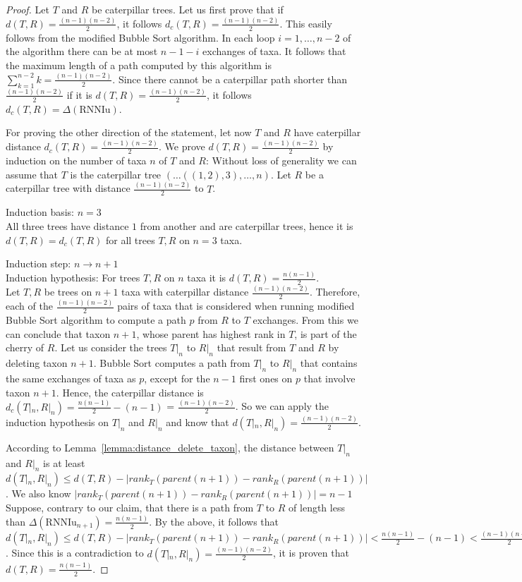 \documentclass{amsart}
\newcommand{\rnniu}{\mathrm{RNNIu}}
\begin{document}
\begin{proof}
    Let $T$ and $R$ be caterpillar trees.
    Let us first prove that if $d(T,R) = \frac{(n-1)(n-2)}{2}$, it follows $d_c(T,R) = \frac{(n-1)(n-2)}{2}$.
    This easily follows from the modified Bubble Sort algorithm. 
    In each loop $i=1, \ldots, n-2$ of the algorithm there can be at most $n-1-i$ exchanges of taxa.
    It follows that the maximum length of a path computed by this algorithm is $\sum\limits_{k=1}^{n-2} k = \frac{(n-1)(n-2)}{2}$.
    Since there cannot be a caterpillar path shorter than $\frac{(n-1)(n-2)}{2}$ if it is $d(T,R) = \frac{(n-1)(n-2)}{2}$, it follows $d_c(T,R) = \Delta(\rnniu)$.

    For proving the other direction of the statement, let now $T$ and $R$ have caterpillar distance $d_c(T,R) =  \frac{(n-1)(n-2)}{2}$.
    We prove $d(T,R) = \frac{(n-1)(n-2)}{2}$ by induction on the number of taxa $n$ of $T$ and $R$:
    Without loss of generality we can assume that $T$ is the caterpillar tree $(\ldots ((1,2),3), \ldots, n)$.
    Let $R$ be a caterpillar tree with distance $\frac{(n-1)(n-2)}{2}$ to $T$.

    Induction basis: $n=3$\\
    All three trees have distance $1$ from another and are caterpillar trees, hence it is $d(T,R) = d_c(T,R)$ for all trees $T,R$ on $n=3$ taxa.

    Induction step: $n \to n+1$\\
    Induction hypothesis: For trees $T, R$ on $n$ taxa it is $d(T, R) = \frac{n(n-1)}{2}$.\\
    Let $T, R$ be trees on $n+1$ taxa with caterpillar distance $\frac{(n-1)(n-2)}{2}$.
    Therefore, each of the $\frac{(n-1)(n-2)}{2}$ pairs of taxa that is considered when running modified Bubble Sort algorithm  to compute a path $p$ from $R$ to $T$ exchanges.
    From this we can conclude that taxon $n+1$, whose parent has highest rank in $T$, is part of the cherry of $R$.
    Let us consider the trees $T|_n$ to $R|_n$ that result from $T$ and $R$ by deleting taxon $n+1$.
    Bubble Sort  computes a path from $T|_n$ to $R|_n$ that contains the same exchanges of taxa as $p$, except for the $n-1$ first ones on $p$ that involve taxon $n+1$.
    Hence, the caterpillar distance is $d_c(T|_n, R|_n) = \frac{n(n-1)}{2} - (n-1)$ = $\frac{(n-1)(n-2)}{2}$.
    So we can apply the induction hypothesis on $T|_n$ and $R|_n$ and know that $d(T|_n,R|_n) = \frac{(n-1)(n-2)}{2}$.

    According to Lemma~\ref{lemma:distance_delete_taxon}, the distance between $T|_n$ and $R|_n$ is at least $d(T|_n, R|_n) \leq d(T,R) - |rank_T(parent(n+1)) - rank_R(parent(n+1))|$.
    We also know $|rank_T(parent(n+1)) - rank_R(parent(n+1))| = n-1$
    Suppose, contrary to our claim, that there is a path from $T$ to $R$ of length less than $\Delta(\rnniu_{n+1}) = \frac{n(n-1)}{2}$.
    By the above, it follows that $d(T|_n, R|_n) \leq d(T,R) - |rank_T(parent(n+1)) - rank_R(parent(n+1))| < \frac{n(n-1)}{2} - (n-1) < \frac{(n-1)(n-2)}{2}$.
    Since this is a contradiction to $d(T|_n, R|_n) = \frac{(n-1)(n-2)}{2}$, it is proven that $d(T,R) = \frac{n(n-1)}{2} $.

\end{proof}
\end{document}
